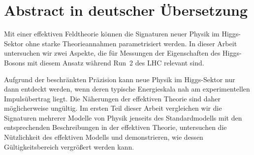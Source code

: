 


\chapter*{Abstract in deutscher \"{U}bersetzung}





Mit einer effektiven Feldtheorie k\"onnen die Signaturen neuer Physik
im Higgs-Sektor ohne starke Theorieannahmen parametrisiert werden. In
dieser Arbeit untersuchen wir zwei Aspekte, die f\"ur Messungen der
Eigenschaften des Higgs-Bosons mit diesem Ansatz w\"ahrend Run~2 des
LHC relevant sind.

Aufgrund der beschr\"ankten Pr\"azision kann neue Physik im
Higgs-Sektor nur dann entdeckt werden, wenn deren typische
Energieskala nah am experimentellen Impuls\"ubertrag liegt. Die
N\"aherungen der effektiven Theorie sind daher m\"oglicherweise
ung\"ultig. Im ersten Teil dieser Arbeit vergleichen wir die
Signaturen mehrerer Modelle von Physik jenseits des Standardmodells
mit den entsprechenden Beschreibungen in der effektiven Theorie,
untersuchen die N\"utzlichkeit des effektiven Modells und
demonstrieren, wie dessen G\"ultigkeitsbereich vergr\"o\ss{}ert werden
kann.


